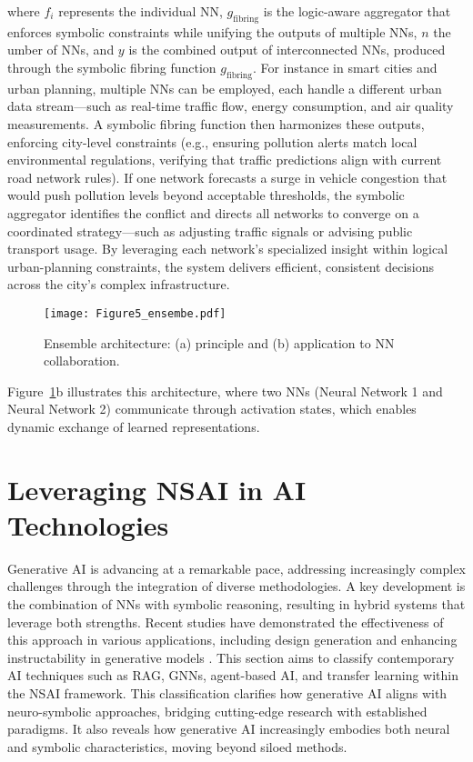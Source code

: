 \documentclass[12pt]{article}
\begin{document}
\noindent where $f_i$ represents the individual NN, $g_\text{fibring}$ is the logic-aware aggregator that enforces symbolic constraints while unifying the outputs of multiple NNs, $n$ the umber of NNs, and $y$ is the combined output of interconnected NNs, produced through the symbolic fibring function $g_\text{fibring}$. For instance in smart cities and urban planning, multiple NNs can be employed, each handle a different urban data stream—such as real-time traffic flow, energy consumption, and air quality measurements. A symbolic fibring function then harmonizes these outputs, enforcing city-level constraints (e.g., ensuring pollution alerts match local environmental regulations, verifying that traffic predictions align with current road network rules). If one network forecasts a surge in vehicle congestion that would push pollution levels beyond acceptable thresholds, the symbolic aggregator identifies the conflict and directs all networks to converge on a coordinated strategy—such as adjusting traffic signals or advising public transport usage. By leveraging each network’s specialized insight within logical urban-planning constraints, the system delivers efficient, consistent decisions across the city’s complex infrastructure.

\begin{figure}[!h]
    \centering
    \texttt{[image: Figure5\_ensembe.pdf]}
    \caption{Ensemble architecture: (a) principle and (b) application to NN collaboration.}
    \label{fig:ensemble}
\end{figure}

Figure~\ref{fig:ensemble}b illustrates this architecture, where two NNs (Neural Network 1 and Neural Network 2) communicate through activation states, which enables dynamic exchange of learned representations.

\section{Leveraging NSAI in AI Technologies}

Generative AI is advancing at a remarkable pace, addressing increasingly complex challenges through the integration of diverse methodologies. A key development is the combination of NNs with symbolic reasoning, resulting in hybrid systems that leverage both strengths. Recent studies have demonstrated the effectiveness of this approach in various applications, including design generation and enhancing instructability in generative models \cite{sheth2024neurosymbolic, jacobson2025integrating}.  This section aims to classify  contemporary AI techniques such as RAG, GNNs,  agent-based AI, and transfer learning within the NSAI framework. This classification clarifies how generative AI aligns with neuro-symbolic approaches, bridging cutting-edge research with established paradigms. It also reveals how generative AI increasingly embodies both neural and symbolic characteristics, moving beyond siloed methods.
\end{document}
